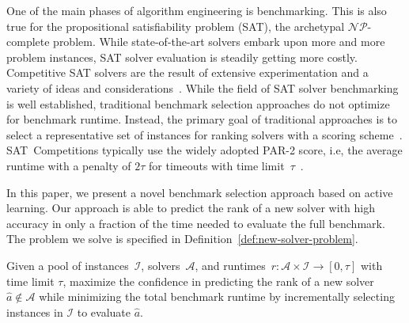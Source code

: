 \documentclass[runningheads]{llncs}
\begin{document}
One of the main phases of algorithm engineering is benchmarking.
This is also true for the pro\-po\-si\-tio\-nal sat\-is\-fia\-bi\-li\-ty problem (SAT), the archetypal $\mathcal{NP}$-complete problem.
While state-of-the-art solvers embark upon more and more problem instances, SAT solver evaluation is steadily getting more costly.
Competitive SAT solvers are the result of extensive experimentation and a variety of ideas and considerations~\cite{FroleyksHIJS21,sat2022}.
While the field of SAT solver benchmarking is well established, traditional benchmark selection approaches do not optimize for benchmark runtime.
Instead, the primary goal of traditional approaches is to select a representative set of instances for ranking solvers with a scoring scheme~\cite{Gelder11,HoosKSS13}.
SAT~Competitions typically use the widely adopted PAR-2 score, i.e, the average runtime with a penalty of $2 \tau$ for timeouts with time limit~$\tau$~\cite{FroleyksHIJS21}.

In this paper, we present a novel benchmark selection approach based on active learning.
Our approach is able to predict the rank of a new solver with high accuracy in only a fraction of the time needed to evaluate the full benchmark.
The problem we solve is specified in Definition~\ref{def:new-solver-problem}.

\begin{definition}
	Given a pool of instances~$\mathcal{I}$, solvers~$\mathcal{A}$, and runtimes~$r\!: \mathcal{A} \times \mathcal{I} \rightarrow \left[0, \tau\right]$ with time limit $\tau$, maximize the confidence in predicting the rank of a new solver $\hat{a} \notin \mathcal{A}$ while minimizing the total benchmark runtime by incrementally selecting instances in $\mathcal{I}$ to evaluate $\hat{a}$.
	\label{def:new-solver-problem}
\end{definition}

\end{document}
